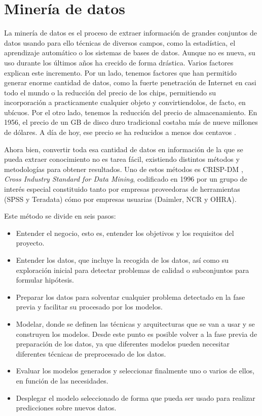 
\section{Minería de datos}
La minería de datos es el proceso de extraer información de grandes conjuntos de datos usando para ello técnicas de diversos campos, como la estadística, el aprendizaje automático o los sistemas de bases de datos. Aunque no es nueva, su uso durante los últimos años ha crecido de forma drástica. Varios factores explican este incremento. Por un lado, tenemos factores que han permitido generar enorme cantidad de datos, como la fuerte penetración de Internet en casi todo el mundo o la reducción del precio de los chips, permitiendo su incorporación a practicamente cualquier objeto y convirtiendolos, de facto, en ubícuos. Por el otro lado, tenemos la reducción del precio de almacenamiento. En 1956, el precio de un GB de disco duro tradicional costaba más de nueve millones de dólares. A día de hoy, ese precio se ha reducidos a menos dos centavos \cite{Evolucion-precio-gb}. 

Ahora bien, convertir toda esa cantidad de datos en información de la que se pueda extraer conocimiento no es tarea fácil, existiendo distintos métodos y metodologías para obtener resultados. Uno de estos métodos es CRISP-DM \cite{CRISP-DM}, \textit{Cross Industry Standard for Data Mining}, codificado en 1996 por un grupo de interés especial constituido tanto por empresas proveedoras de herramientas (SPSS y Teradata) cómo por empresas usuarias (Daimler, NCR y OHRA).

Este método se divide en seis pasos:
\begin{itemize}
	\item Entender el negocio, esto es, entender los objetivos y los requisitos del proyecto.
	\item Entender los datos, que incluye la recogida de los datos, así como su exploración inicial para detectar problemas de calidad o subconjuntos para formular hipótesis.
	\item Preparar los datos para solventar cualquier problema detectado en la fase previa y facilitar su procesado por los modelos.
	\item Modelar, donde se definen las técnicas y arquitecturas que se van a usar y se construyen los modelos. Desde este punto es posible volver a la fase previa de preparación de los datos, ya que diferentes modelos pueden necesitar diferentes técnicas de preprocesado de los datos.
	\item Evaluar los modelos generados y seleccionar finalmente uno o varios de ellos, en función de las necesidades.
	\item Desplegar el modelo seleccionado de forma que pueda ser usado para realizar predicciones sobre nuevos datos.
\end{itemize}

